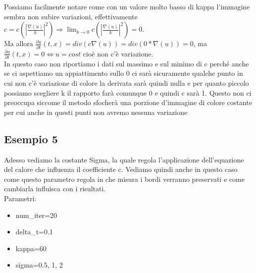 Possiamo facilmente notare come con un valore molto basso di kappa l'immagine sembra non subire variazioni, effettivamente
$c=c(|\frac{\nabla(u)}{k}|^2)\Longrightarrow\lim_{k\to0}c(|\frac{\nabla(u)}{k}|^2)=0$.\\
Ma allora $\frac{\partial u}{\partial t}(t,x)=div(c\nabla(u))=div(0*\nabla(u))=0$, ma $\frac{\partial u}{\partial t}(t,x)=0 \Leftrightarrow u=cost$ cioè non c'è variazione.\\
In questo caso non riportiamo i dati sul massimo e sul minimo di c perché anche se ci aspettiamo un appiattimento sullo 0 ci sarà sicuramente qualche punto in cui non c'è variazione di colore la derivata sarà quindi nulla e per quanto piccolo possiamo scegliere k il rapporto farà comunque 0 e quindi c sarà 1. Questo non ci preoccupa siccome il metodo sfocherà una porzione d'immagine di colore costante per cui anche in questi punti non avremo nessuna variazione

\newpage
\subsection{Esempio 5}
Adesso vediamo la costante Sigma, la quale regola l'applicazione dell'equazione del calore che influenza il coefficiente c. Vediamo quindi anche in questo caso come questo parametro regola in che misura i bordi verranno preservati e come cambiarla influisca con i risultati.\\
Parametri:
\begin{itemize}
    \item num\_iter=20
    \item delta\_t=0.1
    \item kappa=60
    \item sigma=0.5, 1, 2
\end{itemize}

